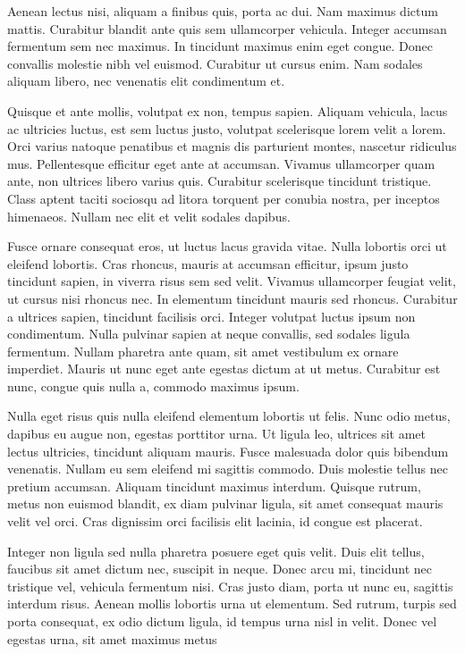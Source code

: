 \documentclass[
  a5paper,
  smalldemyvopaper,10pt,twoside,onecolumn,openright,extrafontsizes,hidelinks]{memoir}
\begin{document}
Aenean lectus nisi, aliquam a finibus quis, porta ac dui. Nam maximus
dictum mattis. Curabitur blandit ante quis sem ullamcorper vehicula.
Integer accumsan fermentum sem nec maximus. In tincidunt maximus enim
eget congue. Donec convallis molestie nibh vel euismod. Curabitur ut
cursus enim. Nam sodales aliquam libero, nec venenatis elit condimentum
et.

Quisque et ante mollis, volutpat ex non, tempus sapien. Aliquam
vehicula, lacus ac ultricies luctus, est sem luctus justo, volutpat
scelerisque lorem velit a lorem. Orci varius natoque penatibus et magnis
dis parturient montes, nascetur ridiculus mus. Pellentesque efficitur
eget ante at accumsan. Vivamus ullamcorper quam ante, non ultrices
libero varius quis. Curabitur scelerisque tincidunt tristique. Class
aptent taciti sociosqu ad litora torquent per conubia nostra, per
inceptos himenaeos. Nullam nec elit et velit sodales dapibus.

Fusce ornare consequat eros, ut luctus lacus gravida vitae. Nulla
lobortis orci ut eleifend lobortis. Cras rhoncus, mauris at accumsan
efficitur, ipsum justo tincidunt sapien, in viverra risus sem sed velit.
Vivamus ullamcorper feugiat velit, ut cursus nisi rhoncus nec. In
elementum tincidunt mauris sed rhoncus. Curabitur a ultrices sapien,
tincidunt facilisis orci. Integer volutpat luctus ipsum non condimentum.
Nulla pulvinar sapien at neque convallis, sed sodales ligula fermentum.
Nullam pharetra ante quam, sit amet vestibulum ex ornare imperdiet.
Mauris ut nunc eget ante egestas dictum at ut metus. Curabitur est nunc,
congue quis nulla a, commodo maximus ipsum.

Nulla eget risus quis nulla eleifend elementum lobortis ut felis. Nunc
odio metus, dapibus eu augue non, egestas porttitor urna. Ut ligula leo,
ultrices sit amet lectus ultricies, tincidunt aliquam mauris. Fusce
malesuada dolor quis bibendum venenatis. Nullam eu sem eleifend mi
sagittis commodo. Duis molestie tellus nec pretium accumsan. Aliquam
tincidunt maximus interdum. Quisque rutrum, metus non euismod blandit,
ex diam pulvinar ligula, sit amet consequat mauris velit vel orci. Cras
dignissim orci facilisis elit lacinia, id congue est placerat.

Integer non ligula sed nulla pharetra posuere eget quis velit. Duis elit
tellus, faucibus sit amet dictum nec, suscipit in neque. Donec arcu mi,
tincidunt nec tristique vel, vehicula fermentum nisi. Cras justo diam,
porta ut nunc eu, sagittis interdum risus. Aenean mollis lobortis urna
ut elementum. Sed rutrum, turpis sed porta consequat, ex odio dictum
ligula, id tempus urna nisl in velit. Donec vel egestas urna, sit amet
maximus metus
\end{document}
